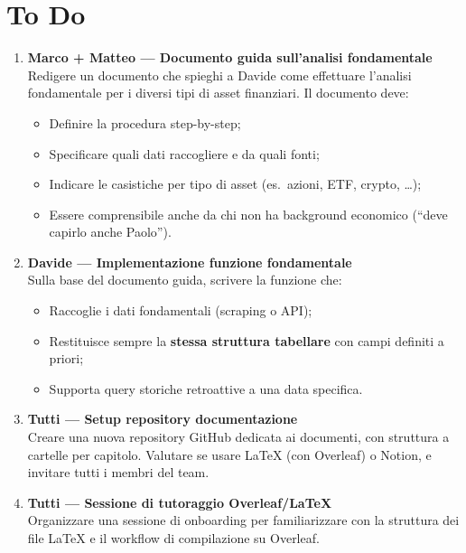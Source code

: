 \documentclass[12pt, a4paper]{article}
\begin{document}
\vspace{0.5cm}

\section{To Do}

\begin{enumerate}[leftmargin=1.5cm, label=\textbf{\arabic*.}]

  \item \textbf{Marco + Matteo — Documento guida sull'analisi fondamentale}\\
  Redigere un documento che spieghi a Davide come effettuare l'analisi fondamentale per i diversi tipi di asset finanziari. Il documento deve:
  \begin{itemize}
    \item Definire la procedura step-by-step;
    \item Specificare quali dati raccogliere e da quali fonti;
    \item Indicare le casistiche per tipo di asset (es.\ azioni, ETF, crypto, \dots);
    \item Essere comprensibile anche da chi non ha background economico (``deve capirlo anche Paolo'').
  \end{itemize}

  \item \textbf{Davide — Implementazione funzione fondamentale}\\
  Sulla base del documento guida, scrivere la funzione che:
  \begin{itemize}
    \item Raccoglie i dati fondamentali (scraping o API);
    \item Restituisce sempre la \textbf{stessa struttura tabellare} con campi definiti a priori;
    \item Supporta query storiche retroattive a una data specifica.
  \end{itemize}

  \item \textbf{Tutti — Setup repository documentazione}\\
  Creare una nuova repository GitHub dedicata ai documenti, con struttura a cartelle per capitolo. Valutare se usare \LaTeX{} (con Overleaf) o Notion, e invitare tutti i membri del team.

  \item \textbf{Tutti — Sessione di tutoraggio Overleaf/\LaTeX}\\
  Organizzare una sessione di onboarding per familiarizzare con la struttura dei file \LaTeX{} e il workflow di compilazione su Overleaf.

\end{enumerate}
\end{document}
